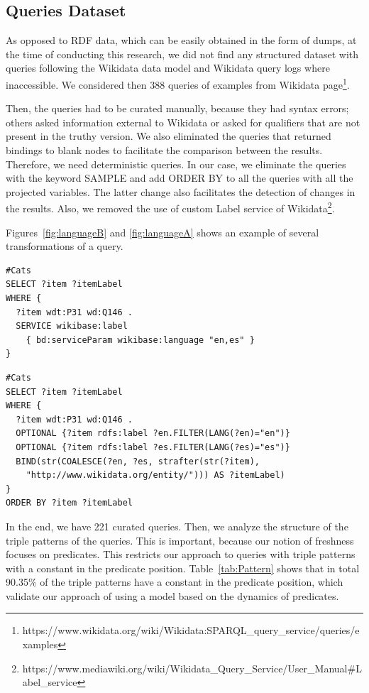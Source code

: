 \documentclass[runningheads]{llncs}
\begin{document}
\subsection{Queries Dataset}

As opposed to RDF data, which can be easily obtained in the form of dumps, at the time of conducting this research, we did not find any structured dataset with queries following the Wikidata data model and Wikidata query logs where inaccessible. We considered then 388 queries of examples from Wikidata page\footnote{https://www.wikidata.org/wiki/Wikidata:SPARQL\_query\_service/queries/examples}.

Then, the queries had to be curated manually, because they had syntax errors; others asked information external to Wikidata or asked for qualifiers that are not present in the truthy version. We also eliminated the queries that returned bindings to blank nodes to facilitate the comparison between the results. Therefore, we need deterministic queries. In our case, we eliminate the queries with the keyword SAMPLE and add ORDER BY to all the queries with all the projected variables. The latter change also facilitates the detection of changes in the results. Also, we removed the use of custom Label service of Wikidata\footnote{https://www.mediawiki.org/wiki/Wikidata\_Query\_Service/User\_Manual\#Label\_service}.

Figures~\ref{fig:languageB} and \ref{fig:languageA} shows an example of several transformations of a query.

\begin{lstlisting}[captionpos=b, caption=Query transformation. Before., label=fig:languageB,
basicstyle=\ttfamily,frame=single]
#Cats
SELECT ?item ?itemLabel
WHERE {
  ?item wdt:P31 wd:Q146 .
  SERVICE wikibase:label
    { bd:serviceParam wikibase:language "en,es" }
}
\end{lstlisting}

\begin{lstlisting}[captionpos=b, caption=Query transformation. After., label=fig:languageA,
basicstyle=\ttfamily,frame=single]
#Cats
SELECT ?item ?itemLabel
WHERE {
  ?item wdt:P31 wd:Q146 .
  OPTIONAL {?item rdfs:label ?en.FILTER(LANG(?en)="en")}
  OPTIONAL {?item rdfs:label ?es.FILTER(LANG(?es)="es")}
  BIND(str(COALESCE(?en, ?es, strafter(str(?item),
    "http://www.wikidata.org/entity/"))) AS ?itemLabel)
}
ORDER BY ?item ?itemLabel
\end{lstlisting}

In the end, we have 221 curated queries. Then, we analyze the structure of the triple patterns of the queries. This is important, because our notion of freshness focuses on predicates. This restricts our approach to queries with triple patterns with a constant in the predicate position. Table~\ref{tab:Pattern} shows that in total 90.35\% of the triple patterns have a constant in the predicate position, which validate our approach of using a model based on the dynamics of predicates.
\end{document}
